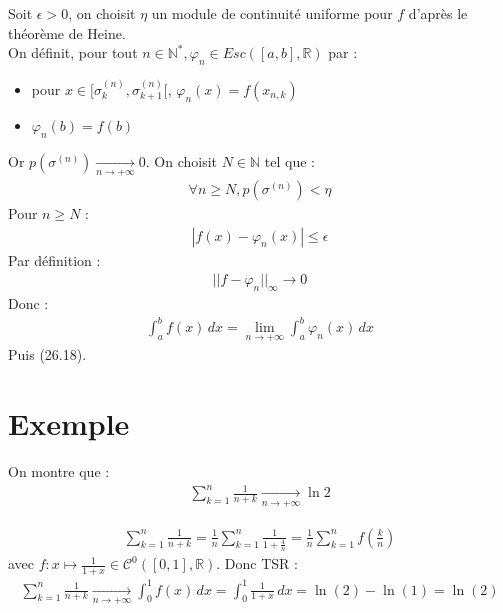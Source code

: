 \documentclass[../main.tex]{subfiles}
\begin{document}
\noindent Soit $\epsilon > 0$, on choisit $\eta$ un module de continuité uniforme pour $f$ d'après le théorème de Heine. \\
On définit, pour tout $n\in \mathbb{N}^*, \varphi_n \in Esc([a, b], \mathbb{R})$ par : 
\begin{itemize}
    \item pour $x\in [\sigma_k^{(n)}, \sigma_{k+1}^{(n)}[$, $\varphi_n(x) = f(x_{n,k})$
    \item $\varphi_n(b) = f(b)$
\end{itemize}
Or $p(\sigma^{(n)}) \underset{n \to +\infty}{\longrightarrow} 0$. On choisit $N\in \mathbb{N}$ tel que : 
\begin{align*}
    \forall n\geq N, p(\sigma^{(n)}) < \eta
\end{align*}
Pour $n\geq N$ : 
\begin{align*}
    |f(x) - \varphi_n(x)| \leq \epsilon
\end{align*}
Par définition : 
\begin{align*}
    ||f - \varphi_n||_{\infty} \longrightarrow 0
\end{align*}
Donc : 
\begin{align*}
    \int_{a}^{b} f(x) \,dx = \lim_{n\to +\infty} \int_{a}^{b} \varphi_n(x) \,dx
\end{align*}
Puis (26.18). 

\section{Exemple}
\begin{tcolorbox}[title=Exemple 26.72, title filled=false, colframe=darkgreen, colback=darkgreen!10!white]
    On montre que : 
    \begin{align*}
        \sum_{k=1}^{n} \frac{1}{n+k} \underset{n \to +\infty}{\longrightarrow} \ln 2
    \end{align*}
\end{tcolorbox}

\begin{align*}
    \sum_{k=1}^{n} \frac{1}{n+k} = \frac{1}{n} \sum_{k=1}^{n} \frac{1}{1 + \frac{4}{n}} = \frac{1}{n} \sum_{k=1}^{n} f(\frac{k}{n})
\end{align*}
avec $f:x\mapsto \frac{1}{1 + x}\in \mathcal{C}^0([0, 1], \mathbb{R})$.
Donc TSR : 
\begin{align*}
    \sum_{k=1}^{n} \frac{1}{n+k} \underset{n \to +\infty}{\longrightarrow} \int_{0}^{1} f(x) \,dx = \int_{0}^{1} \frac{1}{1+x} \,dx = \ln(2) - \ln(1) = \ln(2)
\end{align*} 
\end{document}

